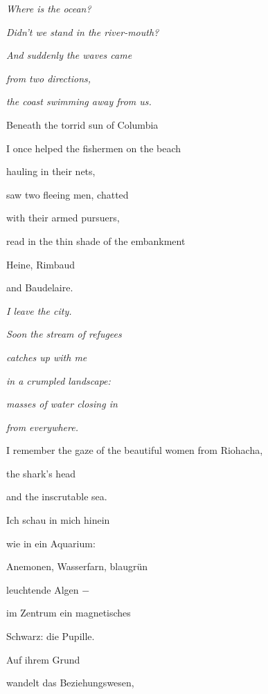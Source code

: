 \documentclass[a4paper]{article}
\begin{document}
{\itshape
Where is the ocean?}

{\itshape
Didn’t we stand in the river-mouth?}

{\itshape
And suddenly the waves came}

{\itshape
from two directions,}

{\itshape
the coast swimming away from us.}


\bigskip

Beneath the torrid sun of Columbia

I once helped the fishermen on the beach 

hauling in their nets,


\bigskip

saw two fleeing men, chatted

with their armed pursuers,


\bigskip

read in the thin shade of the embankment

Heine, Rimbaud

and Baudelaire.


\bigskip

{\itshape
I leave the city.}

{\itshape
Soon the stream of refugees}

{\itshape
catches up with me}

{\itshape
in a crumpled landscape:}

{\itshape
masses of water closing in}

{\itshape
from everywhere.}


\bigskip

I remember the gaze of the beautiful women from Riohacha,

the shark’s head

and the inscrutable sea.


\bigskip



\bigskip

Ich schau in mich hinein

wie in ein Aquarium:

Anemonen, Wasserfarn, blaugrün

leuchtende Algen $-$

im Zentrum ein magnetisches 

Schwarz: die Pupille.


\bigskip

Auf ihrem Grund

wandelt das Beziehungswesen,
\end{document}

